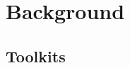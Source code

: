 \documentclass[acmsmall]{acmart}
\begin{document}

\section{Background}

\subsection{Toolkits}
\end{document}

